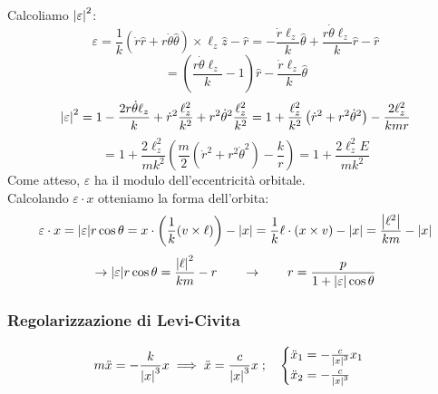 Calcoliamo $\abs{\varepsilon}^2$:
\begin{equation*}
    \varepsilon = \frac{1}{k} \left( \dot{r} \hat{r} + r \dot{\theta} \hat{\theta} \right) \times \ell_z \hat{z} - \hat{r} 
    = - \frac{\dot{r} \ell_z}{k} \hat{\theta} + \frac{r \dot{\theta} \ell_z}{k} \hat{r} - \hat{r}
\end{equation*}
\begin{equation*}
    = \left( \frac{r \dot{\theta} \ell_z}{k} - 1 \right) \hat{r} - \frac{\dot{r} \ell_z}{k} \hat{\theta}
\end{equation*}
\begin{equation*}
    \abs{\varepsilon}^2 = 1 - \frac{2r \dot{\theta} \ell_z }{k} + \dot{r}^2 \frac{\ell_z^2}{k^2} + r^2 \dot{\theta}^2 \frac{\ell_z^2}{k^2}
    = 1 + \frac{\ell_z^2}{k^2} \left( \dot{r}^2 + r^2 \dot{\theta}^2 \right) - \frac{2\ell_z^2}{k m r}
\end{equation*}
\begin{equation}
    = 1 + \frac{2\ell_z^2}{m k^2} \left( \frac{m}{2} \left( \dot{r}^2 + r^2 \dot{\theta}^2 \right) - \frac{k}{r} \right)
    = 1 + \frac{2\ell_z^2 E}{m k^2}
\end{equation}
Come atteso, $\varepsilon$ ha il modulo dell'eccentricità orbitale.\\
Calcolando $\varepsilon\cdot x$ otteniamo la forma dell'orbita:
\begin{equation*}
    \varepsilon \cdot x = \abs{\varepsilon} r \cos\theta = x \cdot \left( \frac{1}{k} (v \times \ell) \right) - \abs{x} 
    = \frac{1}{k}\ell\cdot\left( x\times v \right)-\abs{x}= \frac{\abs{\ell^2}}{km}-\abs{x}
\end{equation*}
\begin{equation*}
    \rightarrow \abs{\varepsilon} r \cos\theta = \frac{\abs{\ell}^2}{km} - r 
    \qquad \rightarrow \qquad r = \frac{p}{1 + \abs{\varepsilon} \cos\theta}
\end{equation*}





\subsubsection{Regolarizzazione di Levi-Civita}
\begin{equation}
    m\ddot{x}= -\frac{k}{\abs{x}^3}x \implies \ddot{x}= \frac{c}{\abs{x}^3}x \;;\quad
    \begin{cases}
        \ddot{x}_1=-\frac{c}{\abs{x}^3}x_1\\
        \ddot{x}_2=-\frac{c}{\abs{x}^3}
    \end{cases}
\end{equation}

